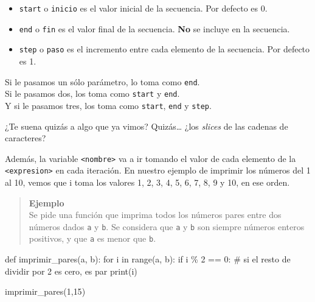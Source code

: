 \documentclass[
  letterpaper,
  DIV=11,
  numbers=noendperiod]{scrreprt}
\newenvironment{Shaded}{\begin{snugshade}}{\end{snugshade}}
\newcommand{\BuiltInTok}[1]{\textcolor[rgb]{0.00,0.23,0.31}{#1}}
\newcommand{\CommentTok}[1]{\textcolor[rgb]{0.37,0.37,0.37}{#1}}
\newcommand{\ControlFlowTok}[1]{\textcolor[rgb]{0.00,0.23,0.31}{#1}}
\newcommand{\DecValTok}[1]{\textcolor[rgb]{0.68,0.00,0.00}{#1}}
\newcommand{\KeywordTok}[1]{\textcolor[rgb]{0.00,0.23,0.31}{#1}}
\newcommand{\NormalTok}[1]{\textcolor[rgb]{0.00,0.23,0.31}{#1}}
\newcommand{\OperatorTok}[1]{\textcolor[rgb]{0.37,0.37,0.37}{#1}}
\providecommand{\tightlist}{%
  \setlength{\itemsep}{0pt}\setlength{\parskip}{0pt}}\usepackage{longtable,booktabs,array}
\begin{document}
\begin{itemize}
\tightlist
\item
  \texttt{start} o \texttt{inicio} es el valor inicial de la secuencia.
  Por defecto es 0.
\item
  \texttt{end} o \texttt{fin} es el valor final de la secuencia.
  \textbf{No} se incluye en la secuencia.
\item
  \texttt{step} o \texttt{paso} es el incremento entre cada elemento de
  la secuencia. Por defecto es 1.
\end{itemize}

Si le pasamos un sólo parámetro, lo toma como \texttt{end}.\\
Si le pasamos dos, los toma como \texttt{start} y \texttt{end}.\\
Y si le pasamos tres, los toma como \texttt{start}, \texttt{end} y
\texttt{step}.

\begin{tcolorbox}[enhanced jigsaw, bottomrule=.15mm, leftrule=.75mm, opacityback=0, colback=white, toprule=.15mm, bottomtitle=1mm, opacitybacktitle=0.6, rightrule=.15mm, left=2mm, arc=.35mm, coltitle=black, title=\textcolor{quarto-callout-note-color}{\faInfo}\hspace{0.5em}{Note}, breakable, toptitle=1mm, colframe=quarto-callout-note-color-frame, titlerule=0mm, colbacktitle=quarto-callout-note-color!10!white]

¿Te suena quizás a algo que ya vimos? Quizás\ldots{} ¿los \emph{slices}
de las cadenas de caracteres?

\end{tcolorbox}

Además, la variable \texttt{\textless{}nombre\textgreater{}} va a ir
tomando el valor de cada elemento de la
\texttt{\textless{}expresion\textgreater{}} en cada iteración. En
nuestro ejemplo de imprimir los números del 1 al 10, vemos que i toma
los valores 1, 2, 3, 4, 5, 6, 7, 8, 9 y 10, en ese orden.\\

\begin{quote}
\textbf{Ejemplo}\\
Se pide una función que imprima todos los números pares entre dos
números dados \texttt{a} y \texttt{b}. Se considera que \texttt{a} y
\texttt{b} son siempre números enteros positivos, y que \texttt{a} es
menor que \texttt{b}.
\end{quote}

\begin{Shaded}
\begin{Highlighting}[]
\KeywordTok{def}\NormalTok{ imprimir\_pares(a, b):}
  \ControlFlowTok{for}\NormalTok{ i }\KeywordTok{in} \BuiltInTok{range}\NormalTok{(a, b):}
    \ControlFlowTok{if}\NormalTok{ i }\OperatorTok{\%} \DecValTok{2} \OperatorTok{==} \DecValTok{0}\NormalTok{: }\CommentTok{\# si el resto de dividir por 2 es cero, es par}
      \BuiltInTok{print}\NormalTok{(i)}

\NormalTok{imprimir\_pares(}\DecValTok{1}\NormalTok{,}\DecValTok{15}\NormalTok{)}
\end{Highlighting}
\end{Shaded}
\end{document}
